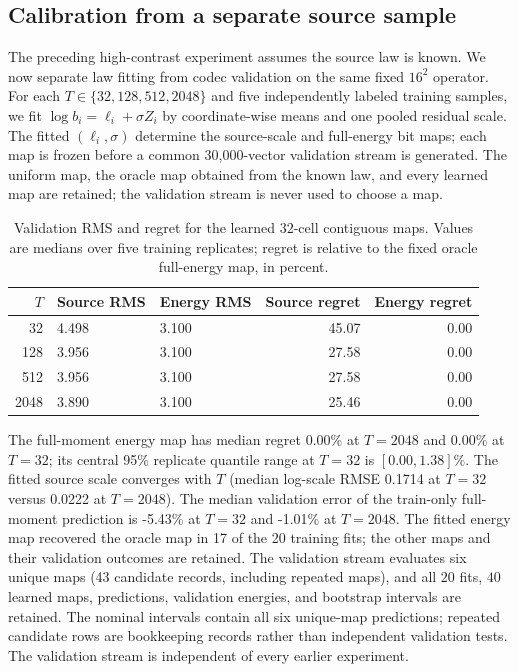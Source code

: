 \subsection{Calibration from a separate source sample}
\label{sec:revision-calibration}
The preceding high-contrast experiment assumes the source law is known. We
now separate law fitting from codec validation on the same fixed $16^2$
operator. For each $T\in\{32,128,512,2048\}$ and five independently labeled
training samples, we fit $\log b_i=\ell_i+\sigma Z_i$ by coordinate-wise
means and one pooled residual scale. The fitted $(\ell_i,\sigma)$ determine
the source-scale and full-energy bit maps; each map is frozen before a common
30,000-vector validation stream is generated. The uniform map, the oracle
map obtained from the known law, and every learned map are retained; the
validation stream is never used to choose a map.

\begin{table}[tb]
\centering
\caption{Validation RMS and regret for the learned $32$-cell contiguous
maps. Values are medians over five training replicates; regret is relative
to the fixed oracle full-energy map, in percent.}
\label{tab:revision-calibration}
\begin{tabular}{rllrr}
\toprule
$T$ & Source RMS & Energy RMS & Source regret & Energy regret\\
\midrule
32 & 4.498 & 3.100 & 45.07 & 0.00 \\
128 & 3.956 & 3.100 & 27.58 & 0.00 \\
512 & 3.956 & 3.100 & 27.58 & 0.00 \\
2048 & 3.890 & 3.100 & 25.46 & 0.00 \\
\bottomrule
\end{tabular}
\end{table}

The full-moment energy map has median regret 0.00\% at $T=2048$
and 0.00\% at $T=32$; its central 95\% replicate quantile range at $T=32$ is
$[0.00,1.38]\%$. The fitted source scale converges with
$T$ (median log-scale RMSE 0.1714 at $T=32$ versus 0.0222 at
$T=2048$). The median validation error of the train-only full-moment
prediction is -5.43\% at $T=32$ and -1.01\% at $T=2048$.
The fitted energy map recovered the oracle map in 17 of the
20 training fits; the other maps and their validation outcomes are retained.
The validation stream evaluates six unique maps (43 candidate records,
including repeated maps), and all $20$ fits, $40$ learned maps, predictions,
validation energies, and bootstrap intervals are retained. The nominal
intervals contain all six unique-map predictions; repeated candidate rows
are bookkeeping records rather than independent validation tests. The
validation stream is independent of every earlier experiment.
